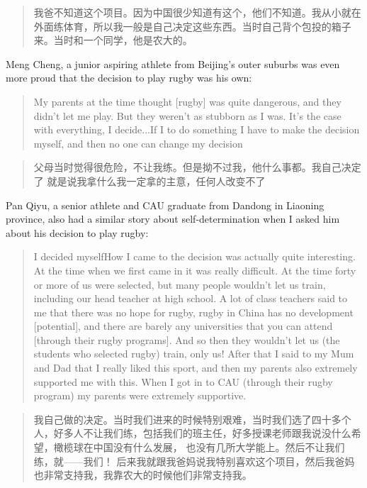 \begin{CJK}{UTF8}{gbsn}
  \begin{quotation}
    我爸不知道这个项目。因为中国很少知道有这个，他们不知道。我从小就在外面练体育，所以我一般是自己决定这些东西。当时自己背个包投的箱子来。当时和一个同学，他是农大的。
  \end{quotation}

Meng Cheng, a junior aspiring athlete from Beijing's outer suburbs was even more proud that the decision to play rugby was his own:

  \begin{quotation}
    My parents at the time thought [rugby] was quite dangerous, and they didn't let me play.  But they weren't as stubborn as I was.  It's the case with everything, I decide...If I to do something I have to make the decision myself, and then no one can change my decision\textellipsis
  \end{quotation}

  \begin{quotation}
    父母当时觉得很危险，不让我练。但是拗不过我，他什么事都。我自己决定了\textellipsis
    就是说我拿什么我一定拿的主意，任何人改变不了\textellipsis
  \end{quotation}


  Pan Qiyu, a senior athlete and CAU graduate from Dandong in Liaoning province, also had a similar story about self-determination when I asked him about his decision to play rugby:

    \begin{quotation}
      I decided myself\textellipsis How I came to the decision was actually quite interesting.  At the time when we first came in it was really difficult.  At the time forty or more of us were selected, but many people wouldn't let us train, including our head teacher at high school.  A lot of class teachers said to me that there was no hope for rugby, rugby in China has no development [potential], and there are barely any universities that you can attend [through their rugby programs].  And so then they wouldn't let us (the students who selected rugby) train, only us! After that I said to my Mum and Dad that I really liked this sport, and then my parents also extremely supported me with this.  When I got in to CAU (through their rugby program) my parents were extremely supportive.
    \end{quotation}

    \begin{quotation}
      我自己做的决定。当时我们进来的时候特别艰难，当时我们选了四十多个人，好多人不让我们练，包括我们的班主任，好多授课老师跟我说没什么希望，橄榄球在中国没有什么发展， 也没有几所大学能上。然后不让我们练，就——我们！ 后来我就跟我爸妈说我特别喜欢这个项目，然后我爸妈也非常支持我，我靠农大的时候他们非常支持我。
    \end{quotation}



\end{CJK}
